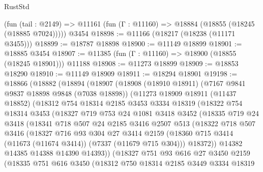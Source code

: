 \begin{lexlean}{RustStd}
\begin{coremodule}
    (fun (tail : @2149) => @11161 (fun (Γ : @11160) => @18884 (@18855 (@18245 (@18885 @7024)))))
    @3454
@18898 := @11166 (@18217 (@18238 (@11171 @3455)))
@18899 := @18787 @18898
@18900 := @11149 @18899
@18901 := @18885 @3454
@18907 := @11385 (fun (Γ : @11160) => @18900 (@18855 (@18245 @18901))) @11188
@18908 := @11273 @18899
@18909 := @18853 @18290
@18910 := @11149 @18909
@18911 := @18294 @18901
@19198 := @18866
    (@18882
      (@18894
        (@18907
          (@18908
            (@18910 @18911)
            (@7167 @9841 @9837 @18898 @9848 (@7038 @18898))
            (@11273
              @18909
              @18911
              (@11437 @18852)
              (@18312
                @754
                @18314
                @2185
                @3453
                @3334
                @18319
                (@18322
                  @754
                  @18314
                  @3453
                  (@18327
                    @719
                    @753
                    @24
                    @1081
                    @3418
                    @3452
                    (@18335
                      @719
                      @24
                      @3418
                      (@18341
                        @718
                        @507
                        @24
                        @2185
                        @3416
                        @2507
                        @513
                        (@18322
                          @718
                          @507
                          @3416
                          (@18327
                            @716
                            @93
                            @304
                            @27
                            @3414
                            @2159
                            (@18360 @715 @3414 (@11673 (@11674 @3414)) (@7337 (@11679 @715 @304)))
                            @18372))
                        @14382
                        @14385
                        @14388
                        @14390
                        @14393))
                    (@18327
                      @751
                      @93
                      @616
                      @27
                      @3450
                      @2159
                      (@18335
                        @751
                        @616
                        @3450
                        (@18312
                          @750
                          @18314
                          @2185
                          @3449
                          @3334
                          @18319

\end{coremodule}
\end{lexlean}
